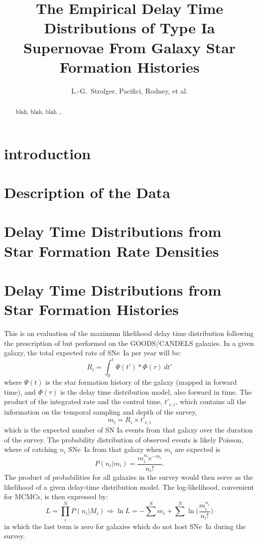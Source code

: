 \documentclass[apj]{aastex}
\begin{document}
\title{The Empirical Delay Time Distributions of Type Ia Supernovae From Galaxy Star Formation Histories}
\author{L.-G.~Strolger, Pacifici, Rodney, et al.}

\begin{abstract}
blah, blah, blah \ldots
\end{abstract}

\section{introduction}

\section{Description of the Data}

\section{Delay Time Distributions from Star Formation Rate Densities}

\section{Delay Time Distributions from Star Formation Histories}
This is an evaluation of the maximum likelihood delay time distribution following the prescription of \cite{Maoz:2012a} but performed on the GOODS/CANDELS galaxies. In a given galaxy, the total expected rate of SNe~Ia per year will be:
\begin{equation}
R_i = \int_0^t \Psi(t') \ast \Phi(\tau)\,dt'
\end{equation}
\noindent where $\Psi(t)$ is the star formation history of the galaxy (mapped in forward time), and $\Phi(\tau)$ is the delay time distribution model, also forward in time. The product of the integrated rate and the control time, $t'_{c, i}$, which contains all the information on the temporal sampling and depth of the survey, 
\begin{equation}
m_i = R_i \times t'_{c, i}
\end{equation}
\noindent which is the expected number of SN Ia events from that galaxy over the duration of the survey. The probability distribution of observed events is likely Poisson, where of catching $n_i$ SNe~Ia from that galaxy when $m_i$ are expected is
\begin{equation}
P(n_i | m_i) = \frac{m_i^{n_i}e^{-m_i}}{n_i!}.
\end{equation}
The product of probabilities for all galaxies in the survey would then serve as the likelihood of a given delay-time distribution model. The log-likelihood, convenient for MCMCs, is then expressed by:
\begin{equation}
L = \prod _i^N P(n_i|M_i) \Rightarrow \ln L = -\sum^N m_i+\sum^N\ln\biggl(\frac{m_i^{n_i}}{n_i!}\biggr)
\end{equation}
\noindent in which the last term is zero for galaxies which do not host SNe~Ia during the survey.
\end{document}
